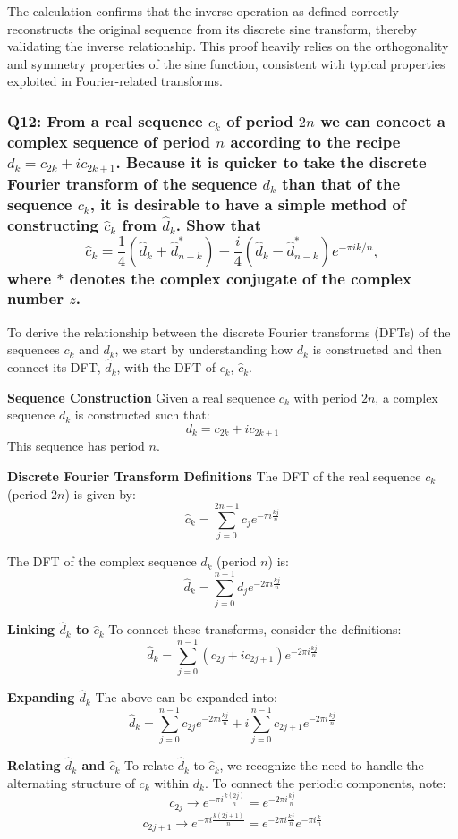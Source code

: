 \documentclass[8pt]{article}
\begin{document}
The calculation confirms that the inverse operation as defined correctly reconstructs the original sequence from its discrete sine transform, thereby validating the inverse relationship. This proof heavily relies on the orthogonality and symmetry properties of the sine function, consistent with typical properties exploited in Fourier-related transforms.

\subsubsection*{Q12:
From a real sequence \(c_k\) of period \(2n\) we can concoct a complex sequence of period \(n\) according to the recipe \(d_k = c_{2k} + i c_{2k+1}\). Because it is quicker to take the discrete Fourier transform of the sequence \(d_k\) than that of the sequence \(c_k\), it is desirable to have a simple method of constructing \(\hat{c}_k\) from \(\hat{d}_k\). Show that
\[
\hat{c}_k = \frac{1}{4} \left( \hat{d}_k + \hat{d}^*_{n-k} \right) - \frac{i}{4} \left( \hat{d}_k - \hat{d}^*_{n-k} \right) e^{-\pi i k / n},
\]
where \(*\) denotes the complex conjugate of the complex number \(z\).}

To derive the relationship between the discrete Fourier transforms (DFTs) of the sequences \(c_k\) and \(d_k\), we start by understanding how \(d_k\) is constructed and then connect its DFT, \(\hat{d}_k\), with the DFT of \(c_k\), \(\hat{c}_k\).

\textbf{Sequence Construction}
Given a real sequence \(c_k\) with period \(2n\), a complex sequence \(d_k\) is constructed such that:
\[
d_k = c_{2k} + i c_{2k+1}
\]
This sequence has period \(n\).

\textbf{Discrete Fourier Transform Definitions}
The DFT of the real sequence \(c_k\) (period \(2n\)) is given by:
\[
\hat{c}_k = \sum_{j=0}^{2n-1} c_j e^{-\pi i \frac{kj}{n}}
\]

The DFT of the complex sequence \(d_k\) (period \(n\)) is:
\[
\hat{d}_k = \sum_{j=0}^{n-1} d_j e^{-2\pi i \frac{kj}{n}}
\]

\textbf{Linking \(\hat{d}_k\) to \(\hat{c}_k\)}
To connect these transforms, consider the definitions:
\[
\hat{d}_k = \sum_{j=0}^{n-1} (c_{2j} + ic_{2j+1}) e^{-2\pi i \frac{kj}{n}}
\]

\textbf{Expanding \(\hat{d}_k\)}
The above can be expanded into:
\[
\hat{d}_k = \sum_{j=0}^{n-1} c_{2j} e^{-2\pi i \frac{kj}{n}} + i \sum_{j=0}^{n-1} c_{2j+1} e^{-2\pi i \frac{kj}{n}}
\]

\textbf{Relating \(\hat{d}_k\) and \(\hat{c}_k\)}
To relate \(\hat{d}_k\) to \(\hat{c}_k\), we recognize the need to handle the alternating structure of \(c_k\) within \(d_k\). To connect the periodic components, note:
\[
c_{2j} \rightarrow e^{-\pi i \frac{k(2j)}{n}} = e^{-2\pi i \frac{kj}{n}}
\]
\[
c_{2j+1} \rightarrow e^{-\pi i \frac{k(2j+1)}{n}} = e^{-2\pi i \frac{kj}{n}} e^{-\pi i \frac{k}{n}}
\]
\end{document}
